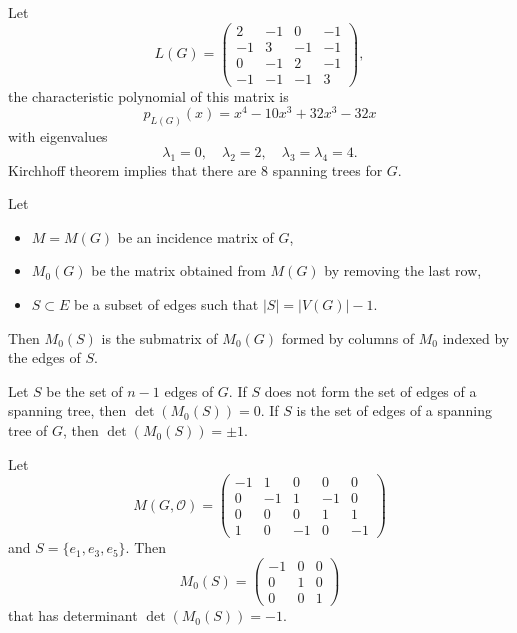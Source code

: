 \begin{example}
Let 
$$
L(G)=\begin{pmatrix}
2 & -1 & 0 & -1 \\
-1 & 3 & -1 & -1 \\
0 & -1 & 2 & -1 \\
-1 & -1 & -1 & 3
\end{pmatrix},
$$
the characteristic polynomial of this matrix is
$$
p_{L(G)}(x)=x^{4}-10x^{3}+32x^{3}-32x
$$
with eigenvalues
$$
\lambda_{1}=0,\quad  \lambda_{2}=2,\quad \lambda_{3}=\lambda_{4}=4.
$$
Kirchhoff theorem implies that there are 8 spanning trees for $G$.
\end{example}
\begin{notation}
Let 
\begin{itemize}
\item $M=M(G)$ be an incidence matrix of $G$, 
\item $M_{0}(G)$ be the matrix obtained from $M(G)$ by removing the last row, 
\item $S\subset E$ be a subset of edges such that $|S|=|V(G)|-1$. 
\end{itemize}
Then $M_{0}(S)$ is the submatrix of $M_{0}(G)$ formed by columns of $M_{0}$ indexed by the edges of $S$.
\end{notation}
\begin{lemma}
Let $S$ be the set of $n-1$ edges of $G$. If $S$ does not form the set of edges of a spanning tree, then $\det(M_{0}(S))=0$. If $S$ is the set of edges of a spanning tree of $G$, then $\det (M_{0}(S))=\pm 1$.
\end{lemma}
\begin{example}
Let 
$$
M(G,\mathcal{O})=\begin{pmatrix}
-1 & 1 & 0 & 0 & 0 \\
0 & -1 & 1 & -1 & 0 \\
0 & 0 & 0 & 1 & 1  \\
1 & 0 & -1 & 0 & -1
\end{pmatrix}
$$
and $S=\{ e_{1},e_{3},e_{5} \}$. Then
$$
M_{0}(S)=\begin{pmatrix}
-1 & 0 & 0 \\
0 & 1 & 0 \\
0 & 0 & 1
\end{pmatrix}
$$
that has determinant $\det(M_{0}(S))=-1$.
\end{example}
